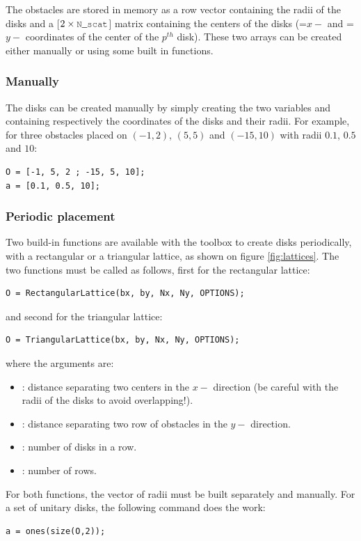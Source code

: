 The obstacles are stored in memory as a row vector  containing the radii of the disks and a [$2\times\code{N\_scat}$] matrix  containing the centers of the disks (=$x-$ and =$y-$ coordinates of the center of the $p^{th}$ disk). These two arrays can be created either manually or using some built in functions.

\subsubsection{Manually}

The disks can be created manually by simply creating the two variables  and  containing respectively the coordinates of the disks and their radii. For example, for three obstacles placed on $(-1,2)$, $(5,5)$ and $(-15,10)$ with radii $0.1$, $0.5$ and $10$:
\begin{lstlisting}
O = [-1, 5, 2 ; -15, 5, 10];
a = [0.1, 0.5, 10];
\end{lstlisting}

\subsubsection{Periodic placement}
\label{secFun:RectangularLattice}
\label{secFun:TriangularLattice}

Two build-in functions are available with the toolbox to create disks periodically, with a rectangular or a triangular lattice, as shown on figure \ref{fig:lattices}. The two functions must be called as follows, first for the rectangular lattice:
\begin{lstlisting}
O = RectangularLattice(bx, by, Nx, Ny, OPTIONS);
\end{lstlisting}
and second for the triangular lattice:
\begin{lstlisting}
O = TriangularLattice(bx, by, Nx, Ny, OPTIONS);
\end{lstlisting}
where the arguments are:
\begin{itemize}
\item {}: distance separating two centers in the $x-$ direction (be careful with the radii of the disks to avoid overlapping!).
\item {}: distance separating two row of obstacles in the $y-$ direction.
\item {}: number of disks in a row.
\item {}: number of rows.
\end{itemize}
For both functions, the vector of radii must be built separately and manually. For a set of unitary disks, the following command does the work:
\begin{lstlisting}
a = ones(size(O,2));
\end{lstlisting}

